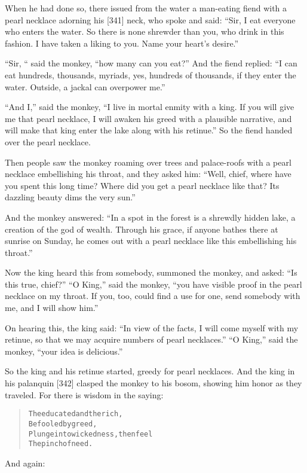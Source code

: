 \documentclass[article, twoside, 14pt]{memoir}
\renewenvironment{verbatim}{%
\begin{quote}%
\vskip -10pt%
\begin{alltt}\normalfont\large}{\end{alltt}%
\end{quote}%
\vskip -10pt
} %
\begin{document}
When he had done so, there issued from the water a man-eating fiend
with a pearl necklace adorning his [341] neck, who spoke and said:
``Sir, I eat everyone who enters the water. So there is none shrewder than you, who drink in this fashion. I have taken a liking to you. Name your heart's desire.''

``Sir, “ said the monkey, “how many can you eat?'' And the fiend
replied:
``I can eat hundreds, thousands, myriads, yes, hundreds of thousands, if they enter the water. Outside, a jackal can overpower me.''

``And I,'' said the monkey,
``I live in mortal enmity with a king. If you will give me that pearl necklace, I will awaken his greed with a plausible narrative, and will make that king enter the lake along with his retinue.''
So the fiend handed over the pearl necklace.

Then people saw the monkey roaming over trees and palace-roofs with
a pearl necklace embellishing his throat, and they asked him:
``Well, chief, where have you spent this long time? Where did you get a pearl necklace like that? Its dazzling beauty dims the very sun.''

And the monkey answered:
``In a spot in the forest is a shrewdly hidden lake, a creation of the god of wealth. Through his grace, if anyone bathes there at sunrise on Sunday, he comes out with a pearl necklace like this embellishing his throat.''

Now the king heard this from somebody, summoned the monkey, and
asked: ``Is this true, chief?'' ``O King,'' said the monkey,
``you have visible proof in the pearl necklace on my throat. If you, too, could find a use for one, send somebody with me, and I will show him.''

On hearing this, the king said:
``In view of the facts, I will come myself with my retinue, so that we may acquire numbers of pearl necklaces.''
``O King,'' said the monkey, ``your idea is delicious.''

So the king and his retinue started, greedy for pearl necklaces.
And the king in his palanquin [342] clasped the monkey to his
bosom, showing him honor as they traveled. For there is wisdom in
the saying:

\begin{verbatim}
The educated and the rich,
    Befooled by greed,
Plunge into wickedness, then feel
    The pinch of need.
\end{verbatim}
And again:
\end{document}

